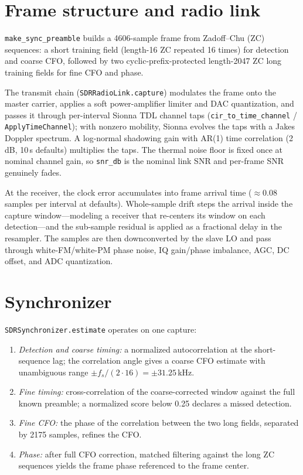\documentclass[10pt]{article}
\newcommand{\code}[1]{\texttt{#1}}
\begin{document}
\section{Frame structure and radio link}
\code{make\_sync\_preamble} builds a 4606-sample frame from Zadoff--Chu (ZC)
sequences: a short training field (length-16 ZC repeated 16 times) for
detection and coarse CFO, followed by two cyclic-prefix-protected length-2047
ZC long training fields for fine CFO and phase.

The transmit chain (\code{SDRRadioLink.capture}) modulates the frame onto the
master carrier, applies a soft power-amplifier limiter and DAC quantization,
and passes it through per-interval Sionna TDL channel taps
(\code{cir\_to\_time\_channel} / \code{ApplyTimeChannel}); with nonzero
mobility, Sionna evolves the taps with a Jakes Doppler spectrum. A
log-normal shadowing gain with AR(1) time correlation (2\,dB, 10\,s defaults)
multiplies the taps. The thermal noise floor is fixed once at nominal channel
gain, so \code{snr\_db} is the nominal link SNR and per-frame SNR genuinely
fades.

At the receiver, the clock error accumulates into frame arrival time
($\approx0.08$ samples per interval at defaults). Whole-sample drift steps
the arrival inside the capture window---modeling a receiver that re-centers
its window on each detection---and the sub-sample residual is applied as a
fractional delay in the resampler. The samples are then downconverted by the
slave LO and pass through white-FM/white-PM phase noise, IQ gain/phase
imbalance, AGC, DC offset, and ADC quantization.

\section{Synchronizer}
\code{SDRSynchronizer.estimate} operates on one capture:
\begin{enumerate}
\item \emph{Detection and coarse timing:} a normalized autocorrelation at the
short-sequence lag; the correlation angle gives a coarse CFO estimate with
unambiguous range $\pm f_s/(2\cdot16) = \pm31.25$\,kHz.
\item \emph{Fine timing:} cross-correlation of the coarse-corrected window
against the full known preamble; a normalized score below 0.25 declares a
missed detection.
\item \emph{Fine CFO:} the phase of the correlation between the two long
fields, separated by 2175 samples, refines the CFO.
\item \emph{Phase:} after full CFO correction, matched filtering against the
long ZC sequences yields the frame phase referenced to the frame center.
\end{enumerate}
\end{document}
